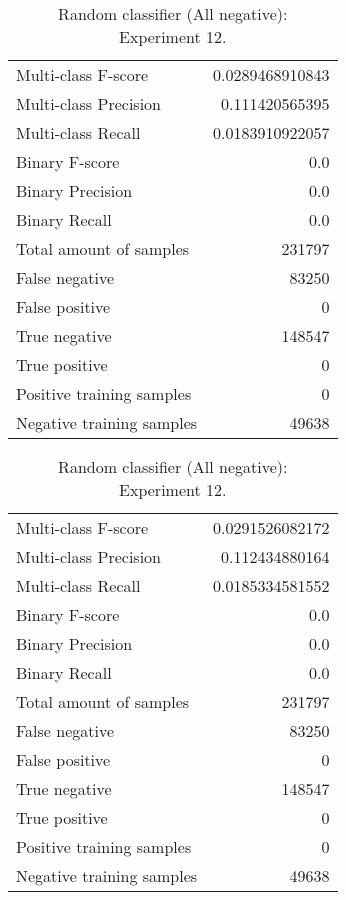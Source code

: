 \begin{table}[H]
\begin{minipage}{0.5\textwidth}
\caption{Random classifier (All negative): \\Experiment 11.}
\centering
\begin{tabular}{l r}
\toprule
Multi-class F-score & 0.0289468910843 \\
Multi-class Precision & 0.111420565395 \\
Multi-class Recall & 0.0183910922057 \\
\midrule
Binary F-score & 0.0 \\
Binary Precision & 0.0 \\
Binary Recall & 0.0 \\
\midrule
Total amount of samples & 231797 \\
False negative & 83250 \\
False positive & 0 \\
True negative & 148547 \\
True positive & 0 \\
\midrule
Positive training samples & 0 \\
Negative training samples & 49638 \\
\bottomrule
\end{tabular}
\end{minipage}
\hfillx
\begin{minipage}{0.5\textwidth}
\caption{Random classifier (All negative): \\Experiment 12.}
\centering
\begin{tabular}{l r}
\toprule
Multi-class F-score & 0.0291526082172 \\
Multi-class Precision & 0.112434880164 \\
Multi-class Recall & 0.0185334581552 \\
\midrule
Binary F-score & 0.0 \\
Binary Precision & 0.0 \\
Binary Recall & 0.0 \\
\midrule
Total amount of samples & 231797 \\
False negative & 83250 \\
False positive & 0 \\
True negative & 148547 \\
True positive & 0 \\
\midrule
Positive training samples & 0 \\
Negative training samples & 49638 \\
\bottomrule
\end{tabular}
\end{minipage}
\end{table}
